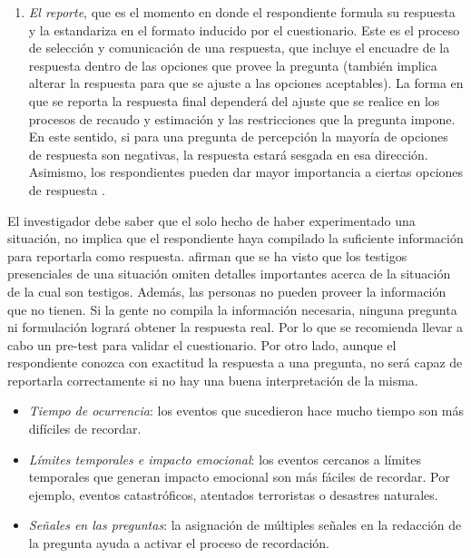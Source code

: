 \documentclass[
  12pt,
  spanish,
]{book}
\providecommand{\tightlist}{%
  \setlength{\itemsep}{0pt}\setlength{\parskip}{0pt}}
\begin{document}
\begin{enumerate}
\item
  \emph{El reporte}, que es el momento en donde el respondiente formula su respuesta y la estandariza en el formato inducido por el cuestionario. Este es el proceso de selección y comunicación de una respuesta, que incluye el encuadre de la respuesta dentro de las opciones que provee la pregunta (también implica alterar la respuesta para que se ajuste a las opciones aceptables). La forma en que se reporta la respuesta final dependerá del ajuste que se realice en los procesos de recaudo y estimación y las restricciones que la pregunta impone. En este sentido, si para una pregunta de percepción la mayoría de opciones de respuesta son negativas, la respuesta estará sesgada en esa dirección. Asimismo, los respondientes pueden dar mayor importancia a ciertas opciones de respuesta \citep{Groves_Fowler_Couper_Lepkowski_Singer_Tourangeau_2009}.
\end{enumerate}

El investigador debe saber que el solo hecho de haber experimentado una situación, no implica que el respondiente haya compilado la suficiente información para reportarla como respuesta. \citet{Groves_Fowler_Couper_Lepkowski_Singer_Tourangeau_2009} afirman que se ha visto que los testigos presenciales de una situación omiten detalles importantes acerca de la situación de la cual son testigos. Además, las personas no pueden proveer la información que no tienen. Si la gente no compila la información necesaria, ninguna pregunta ni formulación logrará obtener la respuesta real. Por lo que se recomienda llevar a cabo un pre-test para validar el cuestionario. Por otro lado, aunque el respondiente conozca con exactitud la respuesta a una pregunta, no será capaz de reportarla correctamente si no hay una buena interpretación de la misma.

\begin{itemize}
\tightlist
\item
  \emph{Tiempo de ocurrencia}: los eventos que sucedieron hace mucho tiempo son más difíciles de recordar.
\item
  \emph{Límites temporales e impacto emocional}: los eventos cercanos a límites temporales que generan impacto emocional son más fáciles de recordar. Por ejemplo, eventos catastróficos, atentados terroristas o desastres naturales.
\item
  \emph{Señales en las preguntas}: la asignación de múltiples señales en la redacción de la pregunta ayuda a activar el proceso de recordación.
\end{itemize}
\end{document}
